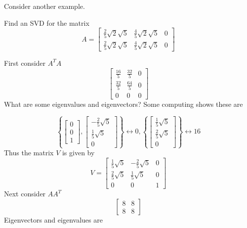 \documentclass{ximera}
\begin{document}
Consider another example.

\begin{example}\label{SVDanother2x3}
Find an SVD for the matrix
\begin{equation*}
A= \left[
\begin{array}{ccc}
\frac{2}{5}\sqrt{2}\sqrt{5} & \frac{4}{5}\sqrt{2}\sqrt{5} & 0 \\
\frac{2}{5}\sqrt{2}\sqrt{5} & \frac{4}{5}\sqrt{2}\sqrt{5} & 0
\end{array}
\right]
\end{equation*}

\begin{explanation}
First consider $A^TA$
\begin{equation*}
\left[
\begin{array}{ccc}
\frac{16}{5} & \frac{32}{5} & 0 \\
\frac{32}{5} & \frac{64}{5} & 0 \\
0 & 0 & 0
\end{array}
\right]
\end{equation*}
What are some eigenvalues and eigenvectors? Some computing shows these are

\begin{equation*}
\left\{ \left[
\begin{array}{c}
0 \\
0 \\
1
\end{array}
\right] ,\left[  
\begin{array}{c}
-\frac{2}{5}\sqrt{5} \\
\frac{1}{5}\sqrt{5} \\
0
\end{array}
\right] \right\} \leftrightarrow 0,\left\{ \left[  
\begin{array}{c}
\frac{1}{5}\sqrt{5} \\
\frac{2}{5}\sqrt{5} \\
0
\end{array}
\right] \right\} \leftrightarrow 16
\end{equation*}
Thus the matrix $V$ is given by
\begin{equation*}
V=\left[
\begin{array}{ccc}
\frac{1}{5}\sqrt{5} & -\frac{2}{5}\sqrt{5} & 0 \\
\frac{2}{5}\sqrt{5} & \frac{1}{5}\sqrt{5} & 0 \\
0 & 0 & 1
\end{array}
\right]
\end{equation*}
Next consider $AA^T$
\begin{equation*}
\left[
\begin{array}{cc}
8 & 8 \\
8 & 8
\end{array}
\right]
\end{equation*}
Eigenvectors and eigenvalues are


\end{explanation}
\end{example}
\end{document}
